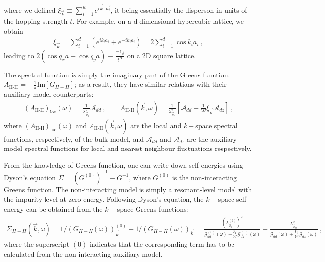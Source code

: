 \documentclass{report}
\numberwithin{equation}{section}
\begin{document}
where we defined \(\xi_{\vec k} \equiv \sum_{i=1}^w e^{i \vec{k}\cdot\vec {a_i}}\), it being essentially the disperson in units of the hopping strength \(t\). For example, on a d-dimensional hypercubic lattice, we obtain
\begin{equation}\begin{aligned}
	\xi_{\vec k} = \sum_{i=1}^d \left(e^{i k_i {a_i}} + e^{-i k_i {a_i}}\right) = 2\sum_{i=1}^d \cos k_i a_i~,
\end{aligned}\end{equation}
leading to \(2(\cos q_{x}a + \cos q_{y}a)\equiv \frac{-\epsilon_{\vec{q}}}{t^{H}}\) on a 2D square lattice. 

The spectral function is simply the imaginary part of the Greens function: \(A_\text{H-H} = -\frac{1}{\pi}\text{Im}\left[G_{H-H}\right] \); as a result, they have similar relations with their auxiliary model counterparts:
\begin{equation}\begin{aligned}
	\left(A_\text{H-H}\right)_\text{loc}(\omega) = \frac{1}{\lambda_{\vec k_0}^2}\mathcal{A}_{dd}~,\qquad A_\text{H-H}(\vec{k},\omega) = \frac{1}{\lambda_{\vec k_0}^2}\left[\mathcal{A}_{dd} + \frac{1}{\mathcal{W}}\xi_{\vec k}\mathcal{A}_{dz} \right]~,
\end{aligned}\end{equation}
where \(\left(A_\text{H-H}\right)_\text{loc}(\omega)\) and \(A_\text{H-H}(\vec{k},\omega)\) are the local and \(k-\)space spectral functions, respectively, of the bulk model, and \(\mathcal{A}_{dd}\) and \(\mathcal{A}_{dz}\) are the auxiliary model spectral functions for local and nearest neighbour fluctuations respectively.

From the knowledge of Greens function, one can write down self-energies using Dyson's equation \(\Sigma = \left(G^{(0)}\right)^{-1} - G^{-1}\), where \(G^{(0)}\) is the non-interacting Greens function. The non-interacting model is simply a resonant-level model with the impurity level at zero energy. Following Dyson's equation, the \(k-\)space self-energy can be obtained from the \(k-\)space Greens functions:
\begin{equation}\begin{aligned}
	\label{self-energy1}
	\Sigma_{H-H}(\vec k,\omega) = 1/\left(G_{H-H}(\omega)\right)_{\vec k}^{(0)} - 1/\left(G_{H-H}(\omega)\right)_{\vec k} = \frac{\left(\lambda_{\vec k_0}^{(0)}\right)^2}{\mathcal{G}^{(0)}_{dd}(\omega) + \frac{\xi_{\vec k}}{\mathcal{W}}\mathcal{G}^{(0)}_{dz}(\omega)} - \frac{\lambda_{\vec k_0}^2}{\mathcal{G}_{dd}(\omega) + \frac{\xi_{\vec k}}{\mathcal{W}}\mathcal{G}_{dz}(\omega)}~,
\end{aligned}\end{equation}
where the superscript \((0)\) indicates that the corresponding term has to be calculated from the non-interacting auxiliary model.
\end{document}
